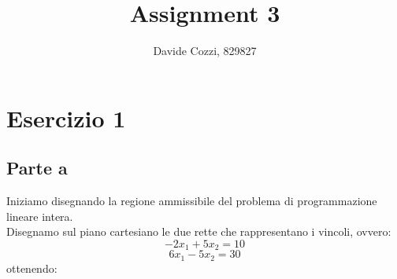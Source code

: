 \documentclass[a4paper,12pt, oneside]{book}
\title{Assignment 3}
\author{Davide Cozzi, 829827}
\date{}
\begin{document}
\maketitle

\newtheorem{teorema}{Teorema}
\newtheorem{definizione}{Definizione}
\newtheorem{esempio}{Esempio}
\newtheorem{corollario}{Corollario}
\newtheorem{lemma}{Lemma}
\newtheorem{osservazione}{Osservazione}
\newtheorem{nota}{Nota}
\newtheorem{esercizio}{Esercizio}

\renewcommand{\chaptermark}[1]{%
  \markboth{\chaptername
    \ \thechapter.\ #1}{}}
\renewcommand{\sectionmark}[1]{\markright{\thesection.\ #1}}
\chapter{Esercizio 1}
\section{Parte a}
Iniziamo disegnando la regione ammissibile del problema di
programmazione lineare intera.\\
Disegnamo sul piano cartesiano le due rette che rappresentano i vincoli,
ovvero:
\[-2x_1+5x_2=10\]
\[6x_1-5x_2=30\]
ottenendo:
\end{document}
